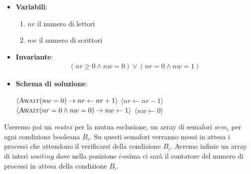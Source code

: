 \documentclass{article}
\begin{document}
\begin{itemize}
  \item \textbf{Variabili}:
    \begin{enumerate}
      \item $nr$ il numero di lettori
      \item $nw$ il numero di scrittori
    \end{enumerate}
  \item \textbf{Invariante}:
    \begin{align*}
      (nr \geq 0 \wedge nw = 0) \vee (nr = 0 \wedge nw = 1)
    \end{align*}
  \item \textbf{Schema di soluzione}:
    \begin{algorithmic}[0]
        \State $\langle \textsc{Await}(nw = 0) \rightarrow nr \gets nr + 1 \rangle$
        \State
        \State $\langle nr \gets nr - 1\rangle$
      \EndProcedure
      \State
        \State $\langle \textsc{Await}(nr = 0 \wedge nw = 0) \rightarrow nw \gets 1 \rangle$
        \State
        \State $\langle nw \gets 0\rangle$
      \EndProcedure
    \end{algorithmic}
\end{itemize}

Useremo poi un \emph{mutex} per la mutua esclusione, un array di semafori $sem_i$
per ogni condizione booleana $B_i$. Su questi semafori verranno messi in attesa
i processi che attendono il verificarsi della condizione $B_i$. Avremo infinie un
array di interi $waiting$ dove nella posizione $i$-esima ci sar\`a il contatore
del numero di processi in attesa della condizione $B_i$.
\end{document}
